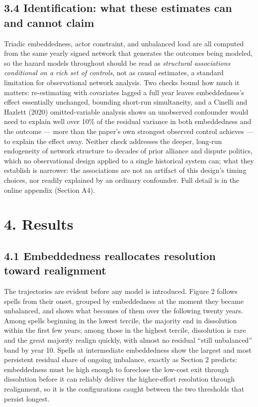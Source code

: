 \documentclass[Afour,sageh,times,doublespace]{sagej}
\begin{document}
\subsection*{3.4 Identification: what these estimates can and cannot claim}

Triadic embeddedness, actor constraint, and unbalanced load are all computed from the same yearly signed network that generates the outcomes being modeled, so the hazard models throughout should be read as \emph{structural associations conditional on a rich set of controls}, not as causal estimates, a standard limitation for observational network analysis. Two checks bound how much it matters: re-estimating with covariates lagged a full year leaves embeddedness's effect essentially unchanged, bounding short-run simultaneity, and a Cinelli and Hazlett (2020) omitted-variable analysis shows an unobserved confounder would need to explain well over 10\% of the residual variance in both embeddedness and the outcome --- more than the paper's own strongest observed control achieves --- to explain the effect away. Neither check addresses the deeper, long-run endogeneity of network structure to decades of prior alliance and dispute politics, which no observational design applied to a single historical system can; what they establish is narrower: the associations are not an artifact of this design's timing choices, nor readily explained by an ordinary confounder. Full detail is in the online appendix (Section A4).

\section*{4. Results}

\subsection*{4.1 Embeddedness reallocates resolution toward realignment}

The trajectories are evident before any model is introduced. Figure 2 follows spells from their onset, grouped by embeddedness at the moment they became unbalanced, and shows what becomes of them over the following twenty years. Among spells beginning in the lowest tercile, the majority end in dissolution within the first few years; among those in the highest tercile, dissolution is rare and the great majority realign quickly, with almost no residual ``still unbalanced'' band by year 10. Spells at intermediate embeddedness show the largest and most persistent residual share of ongoing imbalance, exactly as Section 2 predicts: embeddedness must be high enough to foreclose the low-cost exit through dissolution before it can reliably deliver the higher-effort resolution through realignment, so it is the configurations caught between the two thresholds that persist longest.
\end{document}
